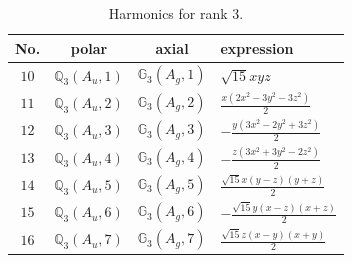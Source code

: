 \documentclass[fleqn,8pt,landscape]{jsarticle}
\begin{document}
\begin{table}[ht!]
\begin{center}
\caption{Harmonics for rank 3.}
\renewcommand{\arraystretch}{1.3}
\begin{tabular}{cccl} \hline \hline
No. & polar & axial & expression \\ \hline
$ 10 $ & $ \mathbb{Q}_{3}(A_{u},1) $ & $ \mathbb{G}_{3}(A_{g},1) $ & $ \sqrt{15} x y z $ \\
$ 11 $ & $ \mathbb{Q}_{3}(A_{u},2) $ & $ \mathbb{G}_{3}(A_{g},2) $ & $ \frac{x \left(2 x^{2} - 3 y^{2} - 3 z^{2}\right)}{2} $ \\
$ 12 $ & $ \mathbb{Q}_{3}(A_{u},3) $ & $ \mathbb{G}_{3}(A_{g},3) $ & $ - \frac{y \left(3 x^{2} - 2 y^{2} + 3 z^{2}\right)}{2} $ \\
$ 13 $ & $ \mathbb{Q}_{3}(A_{u},4) $ & $ \mathbb{G}_{3}(A_{g},4) $ & $ - \frac{z \left(3 x^{2} + 3 y^{2} - 2 z^{2}\right)}{2} $ \\
$ 14 $ & $ \mathbb{Q}_{3}(A_{u},5) $ & $ \mathbb{G}_{3}(A_{g},5) $ & $ \frac{\sqrt{15} x \left(y - z\right) \left(y + z\right)}{2} $ \\
$ 15 $ & $ \mathbb{Q}_{3}(A_{u},6) $ & $ \mathbb{G}_{3}(A_{g},6) $ & $ - \frac{\sqrt{15} y \left(x - z\right) \left(x + z\right)}{2} $ \\
$ 16 $ & $ \mathbb{Q}_{3}(A_{u},7) $ & $ \mathbb{G}_{3}(A_{g},7) $ & $ \frac{\sqrt{15} z \left(x - y\right) \left(x + y\right)}{2} $ \\
 \hline \hline
\end{tabular}
\end{center}
\end{table}
\end{document}
